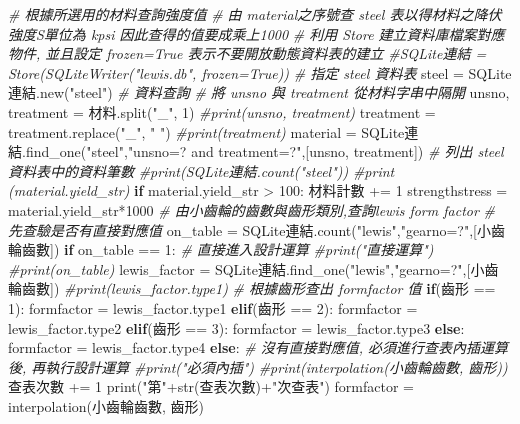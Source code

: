 \documentclass[]{article}
\newenvironment{Shaded}{}{}
\newcommand{\KeywordTok}[1]{\textcolor[rgb]{0.00,0.44,0.13}{\textbf{{#1}}}}
\newcommand{\DataTypeTok}[1]{\textcolor[rgb]{0.56,0.13,0.00}{{#1}}}
\newcommand{\DecValTok}[1]{\textcolor[rgb]{0.25,0.63,0.44}{{#1}}}
\newcommand{\StringTok}[1]{\textcolor[rgb]{0.25,0.44,0.63}{{#1}}}
\newcommand{\CommentTok}[1]{\textcolor[rgb]{0.38,0.63,0.69}{\textit{{#1}}}}
\newcommand{\NormalTok}[1]{{#1}}
\begin{document}
\begin{Shaded}
\begin{Highlighting}[]
    \CommentTok{# 根據所選用的材料查詢強度值}
    \CommentTok{# 由 material之序號查 steel 表以得材料之降伏強度S單位為 kpsi 因此查得的值要成乘上1000}
    \CommentTok{# 利用 Store  建立資料庫檔案對應物件, 並且設定 frozen=True 表示不要開放動態資料表的建立}
    \CommentTok{#SQLite連結 = Store(SQLiteWriter("lewis.db", frozen=True))}
    \CommentTok{# 指定 steel 資料表}
    \NormalTok{steel = SQLite連結.new(}\StringTok{"steel"}\NormalTok{)}
    \CommentTok{# 資料查詢}
    \CommentTok{# 將 unsno 與 treatment 從材料字串中隔開}
    \NormalTok{unsno, treatment = 材料.split(}\StringTok{"_"}\NormalTok{, }\DecValTok{1}\NormalTok{)}
    \CommentTok{#print(unsno, treatment)}
    \NormalTok{treatment = treatment.replace(}\StringTok{"_"}\NormalTok{, }\StringTok{" "}\NormalTok{)}
    \CommentTok{#print(treatment)}
    \NormalTok{material = SQLite連結.find_one(}\StringTok{"steel"}\NormalTok{,}\StringTok{"unsno=? and treatment=?"}\NormalTok{,[unsno, treatment])}
    \CommentTok{# 列出 steel 資料表中的資料筆數}
    \CommentTok{#print(SQLite連結.count("steel"))}
    \CommentTok{#print (material.yield_str)}
    \KeywordTok{if} \NormalTok{material.yield_str > }\DecValTok{100}\NormalTok{:}
        \NormalTok{材料計數 += }\DecValTok{1}
    \NormalTok{strengthstress = material.yield_str*}\DecValTok{1000}
    \CommentTok{# 由小齒輪的齒數與齒形類別,查詢lewis form factor}
    \CommentTok{# 先查驗是否有直接對應值}
    \NormalTok{on_table = SQLite連結.count(}\StringTok{"lewis"}\NormalTok{,}\StringTok{"gearno=?"}\NormalTok{,[小齒輪齒數])}
    \KeywordTok{if} \NormalTok{on_table == }\DecValTok{1}\NormalTok{:}
        \CommentTok{# 直接進入設計運算}
        \CommentTok{#print("直接運算")}
        \CommentTok{#print(on_table)}
        \NormalTok{lewis_factor = SQLite連結.find_one(}\StringTok{"lewis"}\NormalTok{,}\StringTok{"gearno=?"}\NormalTok{,[小齒輪齒數])}
        \CommentTok{#print(lewis_factor.type1)}
        \CommentTok{# 根據齒形查出 formfactor 值}
        \KeywordTok{if}\NormalTok{(齒形 == }\DecValTok{1}\NormalTok{):}
            \NormalTok{formfactor = lewis_factor.type1}
        \KeywordTok{elif}\NormalTok{(齒形 == }\DecValTok{2}\NormalTok{):}
            \NormalTok{formfactor = lewis_factor.type2}
        \KeywordTok{elif}\NormalTok{(齒形 == }\DecValTok{3}\NormalTok{):}
            \NormalTok{formfactor = lewis_factor.type3}
        \KeywordTok{else}\NormalTok{:}
            \NormalTok{formfactor = lewis_factor.type4}
    \KeywordTok{else}\NormalTok{:}
        \CommentTok{# 沒有直接對應值, 必須進行查表內插運算後, 再執行設計運算}
        \CommentTok{#print("必須內插")}
        \CommentTok{#print(interpolation(小齒輪齒數, 齒形))}
        \NormalTok{查表次數 += }\DecValTok{1}
        \DataTypeTok{print}\NormalTok{(}\StringTok{"第"}\NormalTok{+}\DataTypeTok{str}\NormalTok{(查表次數)+}\StringTok{"次查表"}\NormalTok{)}
        \NormalTok{formfactor = interpolation(小齒輪齒數, 齒形)}


\end{Highlighting}
\end{Shaded}
\end{document}
